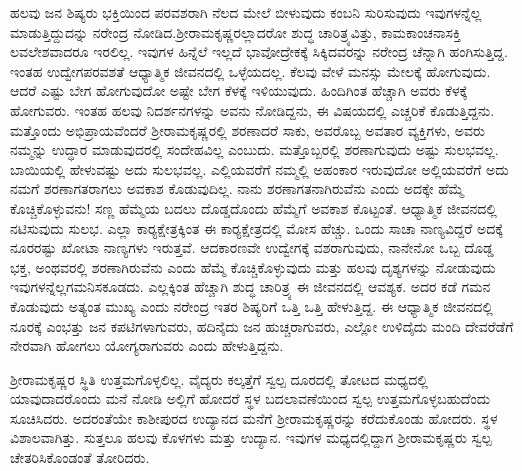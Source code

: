 ಹಲವು ಜನ ಶಿಷ್ಯರು ಭಕ್ತಿಯಿಂದ ಪರವಶರಾಗಿ ನೆಲದ ಮೇಲೆ ಬೀಳುವುದು ಕಂಬನಿ ಸುರಿಸುವುದು ಇವುಗಳನ್ನೆಲ್ಲ ಮಾಡುತ್ತಿದ್ದುದನ್ನು ನರೇಂದ್ರ ನೋಡಿದ.\break ಶ‍್ರೀರಾಮಕೃಷ್ಣರಲ್ಲಾದರೋ ಶುದ್ಧ ಚಾರಿತ್ರ್ಯವಿತ್ತು, ಕಾಮಕಾಂಚನಾಸಕ್ತಿ ಲವಲೇಶವಾದರೂ ಇರಲಿಲ್ಲ. ಇವುಗಳ ಹಿನ್ನೆಲೆ ಇಲ್ಲದೆ ಭಾವೋದ್ರೇಕಕ್ಕೆ ಸಿಕ್ಕಿದವರನ್ನು ನರೇಂದ್ರ ಚೆನ್ನಾಗಿ ಹಂಗಿಸುತ್ತಿದ್ದ. ಇಂತಹ ಉದ್ವೇಗಪರವಶತೆ ಆಧ್ಯಾತ್ಮಿಕ ಜೀವನದಲ್ಲಿ ಒಳ್ಳೆಯದಲ್ಲ. ಕೆಲವು ವೇಳೆ ಮನಸ್ಸು ಮೇಲಕ್ಕೆ ಹೋಗುವುದು. ಆದರೆ ಎಷ್ಟು ಬೇಗ ಹೋಗುವುದೋ ಅಷ್ಟೇ ಬೇಗ ಕೆಳಕ್ಕೆ ಇಳಿಯುವುದು. ಹಿಂದಿಗಿಂತ ಹೆಚ್ಚಾಗಿ ಅವರು ಕೆಳಕ್ಕೆ ಹೋಗುವರು. ಇಂತಹ ಹಲವು ನಿದರ್ಶನಗಳನ್ನು ಅವನು ನೋಡಿದ್ದನು, ಈ ವಿಷಯದಲ್ಲಿ ಎಚ್ಚರಿಕೆ ಕೊಡುತ್ತಿದ್ದನು. ಮತ್ತೊಂದು ಅಭಿಪ್ರಾಯವೆಂದರೆ ಶ‍್ರೀರಾಮಕೃಷ್ಣರಲ್ಲಿ ಶರಣಾದರೆ ಸಾಕು, ಅವರೊಬ್ಬ ಅವತಾರ ವ್ಯಕ್ತಿಗಳು, ಅವರು ನಮ್ಮನ್ನು ಉದ್ಧಾರ ಮಾಡುವುದರಲ್ಲಿ ಸಂದೇಹವಿಲ್ಲ ಎಂಬುದು. ಮತ್ತೊಬ್ಬರಲ್ಲಿ ಶರಣಾಗುವುದು ಅಷ್ಟು ಸುಲಭವಲ್ಲ. ಬಾಯಿಯಲ್ಲಿ ಹೇಳುವಷ್ಟು ಅದು ಸುಲಭವಲ್ಲ. ಎಲ್ಲಿಯವರೆಗೆ ನಮ್ಮಲ್ಲಿ ಅಹಂಕಾರ ಇರುವುದೋ ಅಲ್ಲಿಯವರೆಗೆ ಅದು ನಮಗೆ ಶರಣಾಗತರಾಗಲು ಅವಕಾಶ ಕೊಡುವುದಿಲ್ಲ. ನಾನು ಶರಣಾಗತನಾಗಿರುವೆನು ಎಂದು ಅದಕ್ಕೇ ಹೆಮ್ಮೆ ಕೊಚ್ಚಿಕೊಳ್ಳುವನು! ಸಣ್ಣ ಹೆಮ್ಮೆಯ ಬದಲು ದೊಡ್ಡದೊಂದು ಹೆಮ್ಮೆಗೆ ಅವಕಾಶ ಕೊಟ್ಟಂತೆ. ಆಧ್ಯಾತ್ಮಿಕ ಜೀವನದಲ್ಲಿ ನಟಿಸುವುದು ಸುಲಭ. ಎಲ್ಲಾ ಕಾರ‍್ಯಕ್ಷೇತ್ರಕ್ಕಿಂತ ಈ ಕಾರ‍್ಯಕ್ಷೇತ್ರದಲ್ಲಿ ಮೋಸ ಹೆಚ್ಚು. ಒಂದು ಸಾಚಾ ನಾಣ್ಯವಿದ್ದರೆ ಅದಕ್ಕೆ ನೂರರಷ್ಟು ಖೋಟಾ ನಾಣ್ಯಗಳು ಇರುತ್ತವೆ. ಆದಕಾರಣವೇ ಉದ್ವೇಗಕ್ಕೆ ವಶರಾಗುವುದು, ನಾನೇನೋ ಒಬ್ಬ ದೊಡ್ಡ ಭಕ್ತ, ಅಂಥವರಲ್ಲಿ ಶರಣಾಗಿರುವೆನು ಎಂದು ಹೆಮ್ಮೆ ಕೊಚ್ಚಿಕೊಳ್ಳುವುದು ಮತ್ತು ಹಲವು ದೃಶ್ಯಗಳನ್ನು ನೋಡುವುದು ಇವುಗಳನ್ನೆಲ್ಲ\break ಗಮನಿಸಕೂಡದು. ಎಲ್ಲಕ್ಕಿಂತ ಹೆಚ್ಚಾಗಿ ಶುದ್ಧ ಚಾರಿತ್ರ್ಯ ಈ ಜೀವನದಲ್ಲಿ ಆವಶ್ಯಕ. ಅದರ ಕಡೆ ಗಮನ ಕೊಡುವುದು ಅತ್ಯಂತ ಮುಖ್ಯ ಎಂದು ನರೇಂದ್ರ ಇತರ ಶಿಷ್ಯರಿಗೆ ಒತ್ತಿ ಒತ್ತಿ ಹೇಳುತ್ತಿದ್ದ. ಈ ಆಧ್ಯಾತ್ಮಿಕ ಜೀವನದಲ್ಲಿ ನೂರಕ್ಕೆ ಎಂಭತ್ತು ಜನ ಕಪಟಿಗಳಾಗುವರು, ಹದಿನೈದು ಜನ ಹುಚ್ಚರಾಗುವರು, ಎಲ್ಲೋ ಉಳಿದೈದು ಮಂದಿ ದೇವರೆಡೆಗೆ ನೇರವಾಗಿ ಹೋಗಲು ಯೋಗ್ಯರಾಗುವರು ಎಂದು ಹೇಳುತ್ತಿದ್ದನು.

ಶ‍್ರೀರಾಮಕೃಷ್ಣರ ಸ್ಥಿತಿ ಉತ್ತಮಗೊಳ್ಳಲಿಲ್ಲ. ವೈದ್ಯರು ಕಲ್ಕತ್ತೆಗೆ ಸ್ವಲ್ಪ ದೂರದಲ್ಲಿ ತೋಟದ ಮಧ್ಯದಲ್ಲಿ ಯಾವುದಾದರೊಂದು ಮನೆ ನೋಡಿ ಅಲ್ಲಿಗೆ ಹೋದರೆ ಸ್ಥಳ ಬದಲಾವಣೆಯಿಂದ ಸ್ವಲ್ಪ ಉತ್ತಮಗೊಳ್ಳಬಹುದೆಂದು ಸೂಚಿಸಿದರು. ಅದರಂತೆಯೇ ಕಾಶೀಪುರದ ಉದ್ಯಾನದ ಮನೆಗೆ ಶ‍್ರೀರಾಮಕೃಷ್ಣರನ್ನು ಕರೆದುಕೊಂಡು ಹೋದರು. ಸ್ಥಳ ವಿಶಾಲವಾಗಿತ್ತು. ಸುತ್ತಲೂ ಹಲವು ಕೊಳಗಳು ಮತ್ತು ಉದ್ಯಾನ. ಇವುಗಳ ಮಧ್ಯದಲ್ಲಿದ್ದಾಗ ಶ‍್ರೀರಾಮಕೃಷ್ಣರು ಸ್ವಲ್ಪ ಚೇತರಿಸಿಕೊಂಡಂತೆ ತೋರಿದರು.

